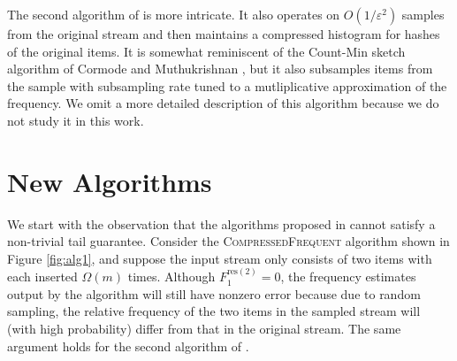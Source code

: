 \documentclass[sigconf,review=true,anonymous=true,screen]{acmart}
\newcommand{\ignore}[1]{}
\newcommand{\eps}{\varepsilon}
\begin{document}
The second algorithm of \cite{BDW16} is more intricate. It also operates on $O(1/\eps^2)$ samples from the original stream and then maintains a compressed histogram for hashes of the original items. It is somewhat reminiscent of the Count-Min sketch algorithm of Cormode and Muthukrishnan \cite{CM05}, but it also subsamples items from the sample with subsampling rate tuned to a mutliplicative approximation of the frequency. We omit a more detailed description of this algorithm because we do not study it in this work.

\ignore{
	\section{Our Contribution: Tail guarantees for randomized counter-based solutions}

We begin by observing that the randomized counter-based algorithms from \cite{BDW16}, described above in Section \ref{sec:bdw}, cannot admit a tail guarantee, like the bound in (\ref{eqn:freq_tail}) shown for \textsc{Frequent}. This is because even if the stream only has two types of elements, so that $F_1^{\text{res}(2)} = 0$, there will still be some error in the frequency approximation from the sampling step. So, random sampling cannot be used as a technique if we want to retain the tail guarantee of \textsc{Frequent}. 

In this work, we show that we can improve \textsc{Frequent} in terms of bits of storage while still achieving the $k$-tail guarantee. We show two different algorithms with this feature. Although they are novel to the best of our knowledge, they are both quite simple to implement and analyze. The first algorithm combines a \textsc{Frequent} data structure with a Count-Min sketch \cite{CM05}. The second algorithm maintains two \textsc{Frequent} data structures, one with a smaller number of counters containing items from the original universe and another with a larger number of counters recording hashes of the original item id's.

Armed with the tail guarantee and following the analysis of Berinde et al.~\cite{BCIS}, we can then show that our proposed algorithms enjoy several other appealing properties, such as guarantees for skewed Zipfian streams, for the sparse recovery problem and for merging multiple streams.
}
\section{New Algorithms}
We start with the observation that the algorithms proposed in \cite{BDW16} cannot satisfy a non-trivial tail guarantee. Consider the \textsc{CompressedFrequent} algorithm shown in Figure \ref{fig:alg1}, and suppose the input stream only consists of two items with each inserted $\Omega(m)$ times. Although $F_1^{\text{res}(2)}=0$, the frequency estimates output by the algorithm will still have nonzero error because due to random sampling, the relative frequency of the two items in the sampled stream will (with high probability) differ from that in the original stream. The same argument holds for the second algorithm of \cite{BDW16}.
\end{document}
